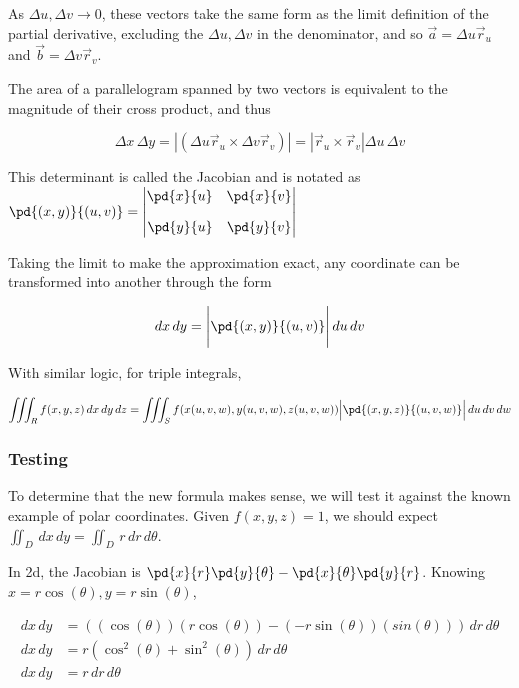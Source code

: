 \documentclass{notes}
\begin{document}
As \(\Delta u, \Delta v \to 0\), these vectors take the same form as the limit definition of the partial derivative, excluding the \(\Delta u, \Delta v\) in the denominator, and so \(\vec{a} = \Delta u \vec{r}_u\) and \(\vec{b} = \Delta v \vec{r}_v\).

The area of a parallelogram spanned by two vectors is equivalent to the magnitude of their cross product, and thus 

\[\Delta x \, \Delta y = |(\Delta u \vec{r}_u \times \Delta v \vec{r}_v)| = |\vec{r}_u \times \vec{r}_v|\Delta u \, \Delta v\]

This determinant is called the Jacobian and is notated as \(\pd{(x, y)}{(u, v)} =
\begin{vmatrix}
    \pd{x}{u} & \pd{x}{v} \\[10px]
    \hfill
    \pd{y}{u} & \pd{y}{v}
\end{vmatrix}
\)

Taking the limit to make the approximation exact, any coordinate can be transformed into another through the form

\[dx \, dy = \Bigg|\pd{(x, y)}{(u, v)}\Bigg|\,du \, dv\]

With similar logic, for triple integrals,

\[\iiint_Rf(x, y, z)\,dx\,dy\,dz = \iiint_S f(x(u, v, w), y(u, v, w), z(u, v, w))\Big| \pd{(x, y, z)}{(u, v, w)}\Big|\,du\,dv\,dw\]

\subsubsection*{Testing}

To determine that the new formula makes sense, we will test it against the known example of polar coordinates. Given \(f(x, y, z) = 1\), we should expect \(\iint_D \,dx\,dy = \iint_D \,r\,dr\,d\theta\).

In 2d, the Jacobian is \(\pd{x}{r}\pd{y}{\theta}- \pd{x}{\theta}\pd{y}{r}\). Knowing \(x = r\cos(\theta), y = r \sin(\theta)\),

\begin{align*}
    dx \,dy &= ((\cos(\theta))(r\cos(\theta)) - (-r\sin(\theta))(sin(\theta)))\,dr\,d\theta\\
    dx\,dy&= r(\cos^2(\theta)+ \sin^2(\theta))\,dr\,d\theta\\
    dx \,dy &= r \,dr\,d\theta
\end{align*}
\end{document}
